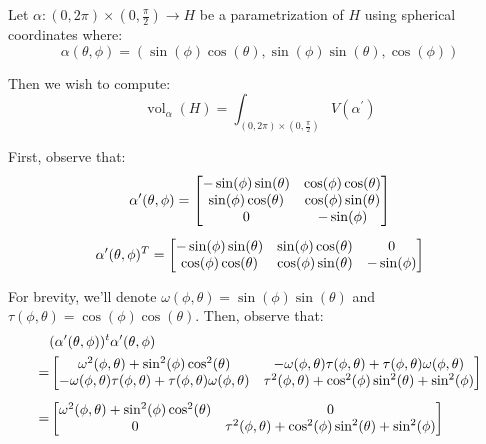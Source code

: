 \begin{pf}[source=Alan]
    Let $\alpha : (0, 2\pi) \times (0, \frac{\pi}{2}) \rightarrow H$ be a
    parametrization of $H$ using spherical coordinates where:
$$
\alpha(\theta, \phi) = (\sin(\phi)\cos(\theta), \sin(\phi)\sin(\theta),
\cos(\phi))
$$

Then we wish to compute:
$$
\operatorname{vol}_\alpha(H) = \int_{(0, 2\pi) \times (0, \frac{\pi}{2})}
V(\alpha^\prime)
$$

First, observe that:
\begin{gather*}
\alpha^\prime(\theta, \phi) = \begin{bmatrix}
-\sin(\phi)\sin(\theta) & \cos(\phi)\cos(\theta) \\
\sin(\phi)\cos(\theta) & \cos(\phi)\sin(\theta) \\
0 & -\sin(\phi)
\end{bmatrix} \vsp
\alpha^\prime(\theta, \phi)^T = \begin{bmatrix}
-\sin(\phi)\sin(\theta) & \sin(\phi)\cos(\theta) & 0 \\
\cos(\phi)\cos(\theta)  & \cos(\phi)\sin(\theta) & -\sin(\phi)
\end{bmatrix}
\end{gather*}

For brevity, we'll denote $ \omega(\phi, \theta) = \sin(\phi)\sin(\theta) $
and $ \tau(\phi, \theta) = \cos(\phi)\cos(\theta) $.
Then, observe that:
\begin{align*}
    & (\alpha^\prime(\theta, \phi))^t\alpha^\prime(\theta, \phi) \\ = &
\begin{bmatrix}
\omega^{2}(\phi, \theta) + \sin^2(\phi)\cos^2(\theta) & -\omega(\phi, \theta)
\tau(\phi, \theta)
+ \tau(\phi, \theta)\omega(\phi, \theta) \\ 
-\omega(\phi, \theta)\tau(\phi, \theta) + \tau(\phi, \theta)\omega(\phi,\theta) &
\tau^{2}(\phi, \theta) + \cos^2(\phi)\sin^2(\theta) + \sin^2(\phi) \\
\end{bmatrix} \vsp
    = & 
\begin{bmatrix}
\omega^{2}(\phi, \theta) + \sin^2(\phi)\cos^2(\theta) & 0 \\ 
0 & \tau^{2}(\phi, \theta) + \cos^2(\phi)\sin^2(\theta) + \sin^2(\phi) \\
\end{bmatrix}
\end{align*}


\end{pf}

